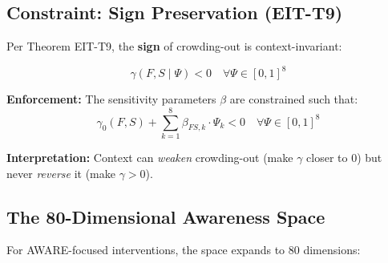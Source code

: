 \subsection{Constraint: Sign Preservation (EIT-T9)}
\label{subsec:emp1-constraint}

\begin{tcolorbox}[colback=red!5!white, colframe=red!75!black,
    title=\textbf{EIT-EMP-1-C1: Sign Preservation Constraint}]

Per Theorem EIT-T9, the \textbf{sign} of crowding-out is context-invariant:

\begin{equation}
\gamma(F, S \;|\; \Psi) < 0 \quad \forall \Psi \in [0,1]^8
\end{equation}

\textbf{Enforcement:} The sensitivity parameters $\beta$ are constrained such that:
\begin{equation}
\gamma_0(F, S) + \sum_{k=1}^{8} \beta_{FS,k} \cdot \Psi_k < 0 \quad \forall \Psi \in [0,1]^8
\end{equation}

\textbf{Interpretation:} Context can \textit{weaken} crowding-out (make $\gamma$ closer to 0) but never \textit{reverse} it (make $\gamma > 0$).

\end{tcolorbox}

\subsection{The 80-Dimensional Awareness Space}
\label{subsec:emp1-awareness}

For AWARE-focused interventions, the space expands to 80 dimensions:

